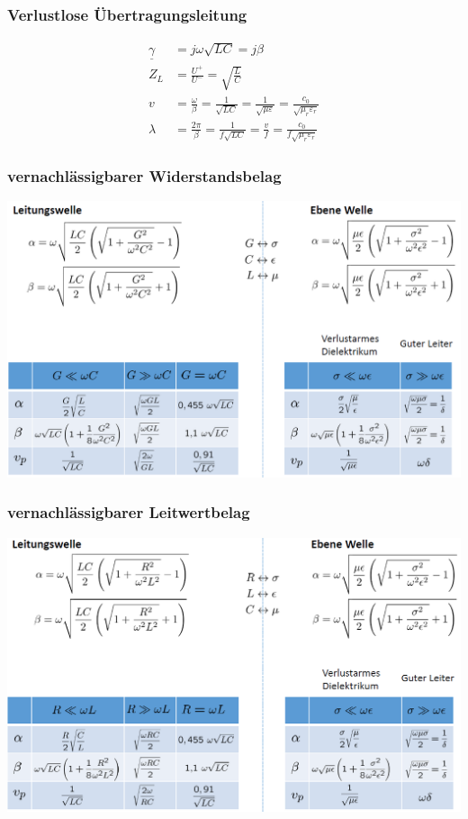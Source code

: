 \subsubsection{Verlustlose Übertragungsleitung}
\begin{align*}
    \underline{\gamma} & = j\omega\sqrt{LC}= j\beta                                                                                           \\
    Z_L                & =\frac{U^+}{U^-}       = \sqrt{\frac{L}{C}}                                                                          \\
    v                  & = \frac{\omega}{\beta} = \frac{1}{\sqrt{LC}}= \frac{1}{\sqrt{\mu\varepsilon}}= \frac{c_0}{\sqrt{\mu_r\varepsilon_r}} \\
    \lambda            & = \frac{2\pi}{\beta}=\frac{1}{f\sqrt{LC}}= \frac{v}{f}= \frac{c_0}{f\sqrt{\mu_r\varepsilon_r}}
\end{align*}

\subsubsection{vernachlässigbarer Widerstandsbelag}
\includegraphics[width=\columnwidth]{Figures/vernachlaessigbarerWiderstandsbelag.png}


\subsubsection{vernachlässigbarer Leitwertbelag}
\includegraphics[width=\columnwidth]{Figures/vernachlaessigbarerLeiterwertbelag.png}


